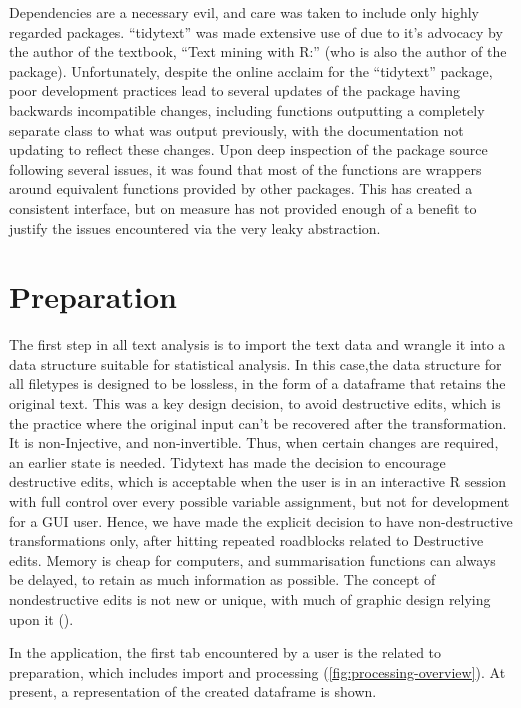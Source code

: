 \documentclass[11pt, a4paper, twoside, titlepage]{report}
\begin{document}
Dependencies are a necessary evil, and care was taken to include only
highly regarded packages. ``tidytext'' was made extensive use of due
to it's advocacy by the author of the textbook, ``Text mining with
R:'' (who is also the author of the package). Unfortunately, despite
the online acclaim for the ``tidytext'' package, poor development
practices lead to several updates of the package having backwards
incompatible changes, including functions outputting a completely
separate class to what was output previously, with the documentation
not updating to reflect these changes. Upon deep inspection of the
package source following several issues, it was found that most of the
functions are wrappers around equivalent functions provided by other
packages. This has created a consistent interface, but on measure has
not provided enough of a benefit to justify the issues encountered via
the very leaky abstraction.

\section{Preparation}\label{sec:import}

The first step in all text analysis is to import the text data and
wrangle it into a data structure suitable for statistical analysis. In
this case,the data structure for all filetypes is designed to be
lossless, in the form of a dataframe that retains the original text.
This was a key design decision, to avoid destructive edits, which is
the practice where the original input can't be recovered after the
transformation. It is non-Injective, and non-invertible. Thus, when
certain changes are required, an earlier state is needed. Tidytext has
made the decision to encourage destructive edits, which is acceptable
when the user is in an interactive R session with full control over
every possible variable assignment, but not for development for a GUI
user. Hence, we have made the explicit decision to have
non-destructive transformations only, after hitting repeated
roadblocks related to Destructive edits. Memory is cheap for
computers, and summarisation functions can always be delayed, to
retain as much information as possible. The concept of nondestructive
edits is not new or unique, with much of graphic design relying upon it
(\autocite{inc.:_nondes_editin_photos}).

In the application, the first tab encountered by a user is the related
to preparation, which includes import and processing
(\cref{fig:processing-overview}). At present, a representation of the
created dataframe is shown.
\end{document}
